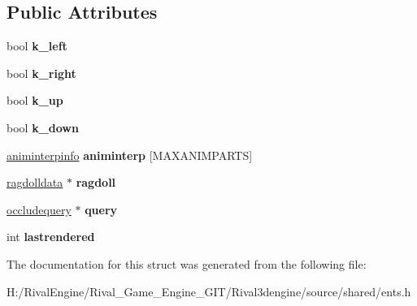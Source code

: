 \subsection*{Public Attributes}
\begin{DoxyCompactItemize}
\item 
\mbox{\label{structdynent_a4d1a81af37056f80ad90cee60b9ecca8}} 
bool {\bfseries k\+\_\+left}
\item 
\mbox{\label{structdynent_a328ca39121b002c30b585162adec026b}} 
bool {\bfseries k\+\_\+right}
\item 
\mbox{\label{structdynent_afaa0d5d6115b157e1b9bf3d61ee42543}} 
bool {\bfseries k\+\_\+up}
\item 
\mbox{\label{structdynent_a093fb4ab684f252e4b315fbef20ee213}} 
bool {\bfseries k\+\_\+down}
\item 
\mbox{\label{structdynent_a9dd2a14bdf3477051377b2764573f406}} 
\hyperlink{structaniminterpinfo}{animinterpinfo} {\bfseries animinterp} \mbox{[}M\+A\+X\+A\+N\+I\+M\+P\+A\+R\+TS\mbox{]}
\item 
\mbox{\label{structdynent_a044523da3ffad90441e3d79fae6d11e4}} 
\hyperlink{structragdolldata}{ragdolldata} $\ast$ {\bfseries ragdoll}
\item 
\mbox{\label{structdynent_abf556f539cfdb81a5546764890a3b753}} 
\hyperlink{structoccludequery}{occludequery} $\ast$ {\bfseries query}
\item 
\mbox{\label{structdynent_a51cc3ac02efb8eba47172bad12806c3d}} 
int {\bfseries lastrendered}
\end{DoxyCompactItemize}


The documentation for this struct was generated from the following file\+:\begin{DoxyCompactItemize}
\item 
H\+:/\+Rival\+Engine/\+Rival\+\_\+\+Game\+\_\+\+Engine\+\_\+\+G\+I\+T/\+Rival3dengine/source/shared/ents.\+h\end{DoxyCompactItemize}
